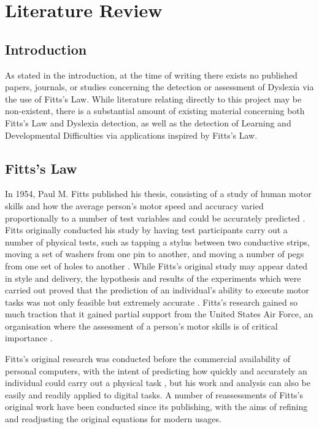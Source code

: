 \section{Literature Review}
	\subsection{Introduction}
		As stated in the introduction, at the time of writing there exists no published papers, journals, or studies concerning the detection or assessment of Dyslexia via the use of Fitts’s Law. While literature relating directly to this project may be non-existent, there is a substantial amount of existing material concerning both Fitts’s Law and Dyslexia detection, as well as the detection of Learning and Developmental Difficulties via applications inspired by Fitts’s Law. 
		
	\subsection{Fitts’s Law}
		In 1954, Paul M. Fitts published his thesis, consisting of a study of human motor skills and how the average person’s motor speed and accuracy varied proportionally to a number of test variables and could be accurately predicted \cite{Fitts1954}. Fitts originally conducted his study by having test participants carry out a number of physical tests, such as tapping a stylus between two conductive strips, moving a set of washers from one pin to another, and moving a number of pegs from one set of holes to another \cite{Fitts1954}. While Fitts’s original study may appear  dated in style and delivery, the hypothesis and results of the experiments which were carried out proved that the prediction of an individual's ability to execute motor tasks was not only feasible but extremely accurate \cite{Fitts1954}. Fitts’s research gained so much traction that it gained partial support from the United States Air Force, an organisation where the assessment of a person’s motor skills is of critical importance \cite{Fitts1954}.
		
		Fitts’s original research was conducted before the commercial availability of personal computers, with the intent of predicting how quickly and accurately an individual could carry out a physical task , but his work and analysis can also be easily and readily applied to digital tasks. A number of reassessments of Fitts’s original work have been conducted since its publishing, with the aims of refining and readjusting the original equations for modern usages.
		
